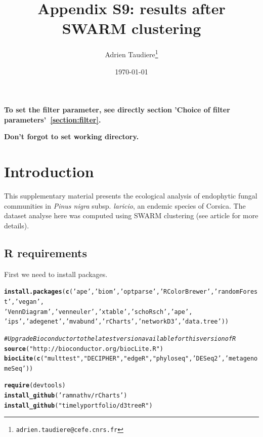 \documentclass[12pt]{article}\usepackage[]{graphicx}\usepackage[]{color}
\title{Appendix S9: results after SWARM clustering}
\author{Adrien Taudiere\thanks{\texttt{adrien.taudiere@cefe.cnrs.fr}}}
\affil{{\footnotesize CEFE - Centre d'Ecologie Fonctionnelle et Evolutive, Montpellier: France}}
\date{\today}
\makeatletter
\newcommand{\hlstr}[1]{\textcolor[rgb]{0.192,0.494,0.8}{#1}}%
\newcommand{\hlcom}[1]{\textcolor[rgb]{0.678,0.584,0.686}{\textit{#1}}}%
\newcommand{\hlstd}[1]{\textcolor[rgb]{0.345,0.345,0.345}{#1}}%
\newcommand{\hlkwd}[1]{\textcolor[rgb]{0.737,0.353,0.396}{\textbf{#1}}}%
\newenvironment{kframe}{%
 \def\at@end@of@kframe{}%
 \ifinner\ifhmode%
  \def\at@end@of@kframe{\end{minipage}}%
  \begin{minipage}{\columnwidth}%
 \fi\fi%
 \def\FrameCommand##1{\hskip\@totalleftmargin \hskip-\fboxsep
 \colorbox{shadecolor}{##1}\hskip-\fboxsep
     \hskip-\linewidth \hskip-\@totalleftmargin \hskip\columnwidth}%
 \MakeFramed {\advance\hsize-\width
   \@totalleftmargin\z@ \linewidth\hsize
   \@setminipage}}%
 {\par\unskip\endMakeFramed%
 \at@end@of@kframe}
\newenvironment{knitrout}{}{} %
\numberwithin{figure}{section}
\makeatother
\begin{document}






\maketitle

\vfill
\begin{center}
\textbf{To set the filter parameter, see directly section 'Choice of filter parameters'~\ref{section:filter}.}

\textbf{Don't forgot to set working directory.}
\end{center}

\newpage
\tableofcontents
\newpage


\section{Introduction}

This supplementary material presents the ecological analysis of endophytic fungal communities in \textit{Pinus nigra} subsp. \textit{laricio}, an endemic species of Corsica. The dataset analyse here was computed using SWARM clustering (see article for more details).

\subsection{R requirements}

First we need to install packages.
\begin{knitrout}\small
{}\color{fgcolor}\begin{kframe}
\begin{alltt}
\hlkwd{install.packages}\hlstd{(}\hlkwd{c}\hlstd{(}\hlstr{'ape'}\hlstd{,} \hlstr{'biom'}\hlstd{,} \hlstr{'optparse'}\hlstd{,} \hlstr{'RColorBrewer'}\hlstd{,} \hlstr{'randomForest'}\hlstd{,}  \hlstr{'vegan'}\hlstd{,}
                  \hlstr{'VennDiagram'}\hlstd{,} \hlstr{'venneuler'}\hlstd{,} \hlstr{'xtable'}\hlstd{,} \hlstr{'schoRsch'}\hlstd{,} \hlstr{'ape'}\hlstd{,}
                 \hlstr{'ips'}\hlstd{,} \hlstr{'adegenet'}\hlstd{,} \hlstr{'mvabund'}\hlstd{,} \hlstr{'rCharts'}\hlstd{,} \hlstr{'networkD3'}\hlstd{,} \hlstr{'data.tree'}\hlstd{))}

\hlcom{# Upgrade Bioconductor to the latest version available for this version of R}
\hlkwd{source}\hlstd{(}\hlstr{"http://bioconductor.org/biocLite.R"}\hlstd{)}
\hlkwd{biocLite}\hlstd{(}\hlkwd{c}\hlstd{(}\hlstr{"multtest"}\hlstd{,} \hlstr{"DECIPHER"}\hlstd{,} \hlstr{"edgeR"}\hlstd{,} \hlstr{"phyloseq"}\hlstd{,} \hlstr{'DESeq2'}\hlstd{,} \hlstr{'metagenomeSeq'}\hlstd{))}

\hlkwd{require}\hlstd{(devtools)}
\hlkwd{install_github}\hlstd{(}\hlstr{'ramnathv/rCharts'}\hlstd{)}
\hlkwd{install_github}\hlstd{(}\hlstr{"timelyportfolio/d3treeR"}\hlstd{)}
\end{alltt}
\end{kframe}
\end{knitrout}
\end{document}
